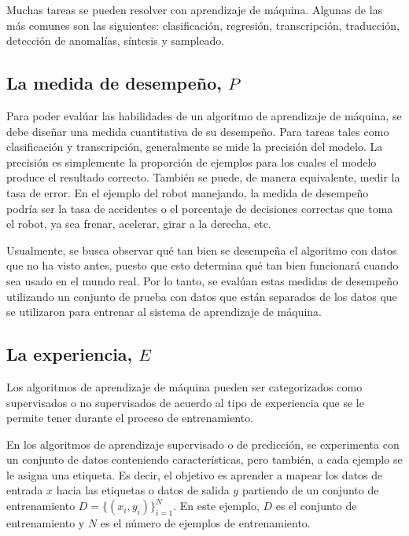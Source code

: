 \vspace{1em}

Muchas tareas se pueden resolver con aprendizaje de máquina. Algunas de las más comunes son las siguientes: clasificación, regresión, transcripción, traducción, detección de anomalías, síntesis y sampleado.
\cite{goodfellow-et-al-2016}

\subsection{La medida de desempeño, $P$}
Para poder evalúar las habilidades de un algoritmo de aprendizaje de máquina, se debe diseñar una medida cuantitativa de su desempeño. Para tareas tales como clasificación y transcripción, generalmente se mide la precisión del modelo. La precisión es simplemente la proporción de ejemplos para los cuales el modelo produce el resultado correcto. También se puede, de manera equivalente, medir la tasa de error. En el ejemplo del robot manejando, la medida de desempeño podría ser la tasa de accidentes o el porcentaje de decisiones correctas que toma el robot, ya sea frenar, acelerar, girar a la derecha, etc.

\vspace{1em}

Usualmente, se busca observar qué tan bien se desempeña el algoritmo con datos que no ha visto antes, puesto que esto determina qué tan bien funcionará cuando sea usado en el mundo real. Por lo tanto, se evalúan estas medidas de desempeño utilizando un conjunto de prueba con datos que están separados de los datos que se utilizaron para entrenar al sistema de aprendizaje de máquina. \cite{goodfellow-et-al-2016}

\subsection{La experiencia, $E$}
Los algoritmos de aprendizaje de máquina pueden ser categorizados como supervisados o no supervisados de acuerdo al tipo de experiencia que se le permite tener durante el proceso de entrenamiento.

\vspace{1em}

En los algoritmos de aprendizaje supervisado o de predicción, se experimenta con un conjunto de datos conteniendo características, pero también, a cada ejemplo se le asigna una etiqueta. Es decir, el objetivo es aprender a mapear los datos de entrada $x$ hacia las etiquetas o datos de salida $y$ partiendo de un conjunto de entrenamiento $D = \{(x_i, y_i)\}_{i=1}^N$. En este ejemplo, $D$ es el conjunto de entrenamiento y $N$ es el número de ejemplos de entrenamiento. \cite{Murphy:2012:MLP:2380985}


